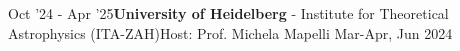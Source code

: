 %
%
%
\begin{experiences}
  \visiting
    {Oct '24 - Apr '25}{\textbf{University of Heidelberg} - Institute for Theoretical Astrophysics (ITA-ZAH)}{Host: Prof. Michela Mapelli }
    {Mar-Apr, Jun 2024}
\end{experiences}
